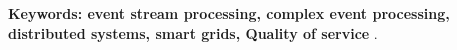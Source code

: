 % 
\vskip2cm
\textbf{Keywords: event stream processing, complex event processing, distributed systems, smart grids, Quality of service} .




